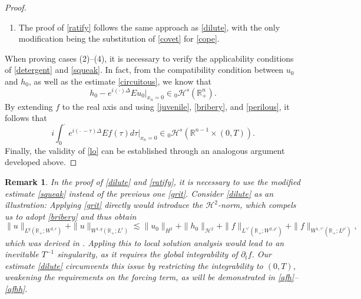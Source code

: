 \documentclass[preprint,compress,12pt]{elsarticle}
\newtheorem{remark}[theorem]{Remark}
\numberwithin{equation}{section}
\begin{document}
\begin{proof}
\begin{enumerate}[label=(\arabic*)]
		\begin{equation}\label{militant} \partial_{t}\int_{0}^{t}e^{i(t-\tau)\Delta}Ef(\tau)d\tau=e^{it\Delta}Ef(0)+\int_{0}^{t}e^{i(t-\tau)\Delta}\partial_{t}Ef(\tau)d\tau.
		\end{equation}
		\item The proof of \eqref{ratify} follows the same approach as \eqref{dilute}, with the only modification being the substitution of \eqref{covet} for \eqref{cope}.
	\end{enumerate}
	When proving cases (2)--(4), it is necessary to verify the applicability conditions of \eqref{detergent} and \eqref{squeak}.
	In fact, from the compatibility condition between $u_{0}$ and $h_{0}$, as well as the estimate \eqref{circuitous}, we know that \[h_{0}-e^{i(\cdot)\Delta}Eu_{0}|_{x_{n}=0}\in {}_{0}\mathcal{H}^{s}(\mathbb{R}^{n}_{+}).\]
	By extending $f$ to the real axis and using \eqref{juvenile}, \eqref{bribery}, and \eqref{perilous}, it follows that  \[i\int_{0}^{\cdot}e^{i(\cdot\,-\tau)\Delta}Ef(\tau)d\tau|_{x_{n}=0}\in{}_{0}\mathcal{H}^{s}(\mathbb{R}^{n-1}\times(0,T)).\] Finally, the validity of \eqref{lo} can be established through
	an analogous argument developed above.
\end{proof}

\begin{remark}
	In the proof of \eqref{dilute} and \eqref{ratify}, it is necessary to use the modified estimate \eqref{squeak} instead of the previous one \eqref{grit}. Consider \eqref{dilute} as an illustration: Applying \eqref{grit} directly would introduce the $\mathcal{H}^{2}$-norm, which compels us to adopt \eqref{bribery} and thus obtain
	\begin{equation*}
		\|u\|_{L^{q}(\mathbb{R}_{+};W^{2,r})}+\|u\|_{W^{1,q}(\mathbb{R}_{+};L^{r})}\lesssim\|u_{0}\|_{H^{2}}+\|h_{0}\|_{\mathcal{H}^{2}}+\|f\|_{L^{\gamma'}(\mathbb{R}_{+};W^{2,\rho'})}+\|f\|_{W^{1,\gamma'}(\mathbb{R}_{+};L^{\rho'})},
	\end{equation*}
	which was derived in \cite{facilitate}.
	Appling this to local solution analysis would lead to an inevitable $T^{-1}$ singularity, as it requires the global integrability of $\partial_{t}f$. Our estimate \eqref{dilute} circumvents this issue by restricting the integrability to  $(0,T)$, weakening the requirements on the forcing term, as will be demonstrated in \eqref{afh}--\eqref{afhh}.
\end{remark}
\end{document}
